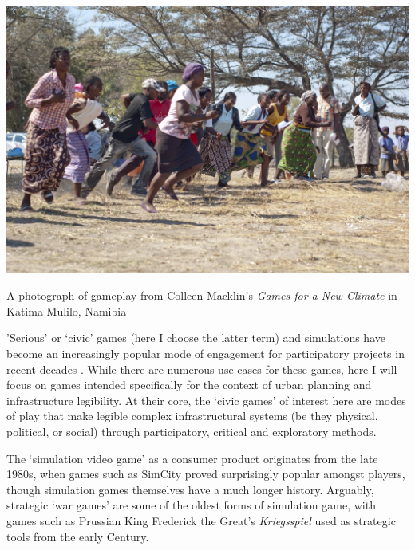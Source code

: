 \documentclass[nofonts,nols,justified,nobib]{tufte-book}
\begin{document}
\begin{marginfigure}
\includegraphics[width=\textwidth]{img/1/macklin-climate.jpg}
\caption{A photograph of gameplay from Colleen Macklin's \emph{Games for a New Climate} in Katima Mulilo, Namibia \cite{macklin_games_2013}}
\end{marginfigure}

'Serious' or `civic' games (here I choose the latter term) and simulations have become an increasingly popular mode of engagement for participatory projects in recent decades \cite{krivy_participatory_2013}. While there are numerous use cases for these games, here I will focus on games intended specifically for the context of urban planning and infrastructure legibility. At their core, the `civic games' of interest here are modes of play that make legible complex infrastructural systems (be they physical, political, or social) through participatory, critical and exploratory methods.

The `simulation video game' as a consumer product originates from the late 1980s, when games such as SimCity proved surprisingly popular amongst players, though simulation games themselves have a much longer history. Arguably, strategic `war games' are some of the oldest forms of simulation game, with games such as Prussian King Frederick the Great's \emph{Kriegsspiel} used as strategic tools from the early  Century. \cite{landa_war_1991}
\end{document}
